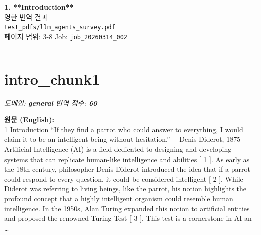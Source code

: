 \documentclass[12pt,a4paper]{article}
\begin{document}
\begin{center}
{\LARGE\bfseries\color{headercolor} 1. **Introduction**}\\[0.5em]
{\large 영한 번역 결과}\\[0.3em]
{\normalsize\texttt{test\_pdfs/llm\_agents\_survey.pdf}}\\
{\small 페이지 범위: 3-8 \quad Job: \texttt{job\_20260314\_002}}
\end{center}
\vspace{1em}
\hrule
\vspace{1em}
\tableofcontents
\newpage

\section{intro\_chunk1}
\noindent\textit{\small 도메인: \textbf{general} \quad 번역 점수: \textbf{\color{orange!80!black}60}}
\vspace{0.5em}

\begin{mdframed}[style=orig]
\noindent\textbf{\small 원문 (English):}\\[2pt]
\small 1 Introduction “If they find a parrot who could answer to everything, I would claim it to be an intelligent being without hesitation.” —Denis Diderot, 1875 Artificial Intelligence (AI) is a field dedicated to designing and developing systems that can replicate human-like intelligence and abilities [ 1 ]. As early as the 18th century, philosopher Denis Diderot introduced the idea that if a parrot could respond to every question, it could be considered intelligent [ 2 ]. While Diderot was referring to living beings, like the parrot, his notion highlights the profound concept that a highly intelligent organism could resemble human intelligence. In the 1950s, Alan Turing expanded this notion to artificial entities and proposed the renowned Turing Test [ 3 ]. This test is a cornerstone in AI an \ldots
\end{mdframed}
\vspace{0.4em}
\end{document}

